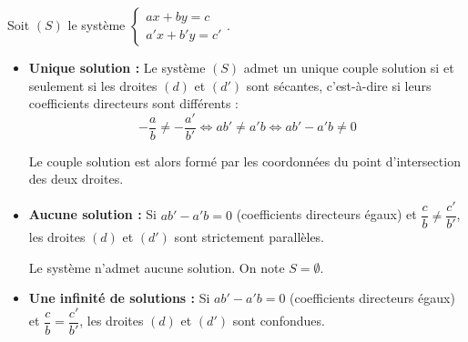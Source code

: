 \begin{propriete}
	Soit $(S)$ le système $\begin{cases} ax + by = c \\ a'x + b'y = c' \end{cases}$.
	\begin{itemize}
		\item \textbf{Unique solution :} Le système $(S)$ admet un unique couple solution si et seulement si les droites $(d)$ et $(d')$ sont sécantes, c'est-à-dire si leurs coefficients directeurs sont différents :
		      \[
			      -\frac{a}{b} \neq -\frac{a'}{b'} \iff ab' \neq a'b \iff ab' - a'b \neq 0
		      \]

		      Le couple solution est alors formé par les coordonnées du point d'intersection des deux droites.
		\item \textbf{Aucune solution :} Si $ab' - a'b = 0$ (coefficients directeurs égaux) et $\dfrac{c}{b}\neq\dfrac{c'}{b'}$, les droites $(d)$ et $(d')$ sont strictement parallèles.

		      Le système n'admet aucune solution. On note $S = \emptyset$.
		\item \textbf{Une infinité de solutions :} Si $ab' - a'b = 0$ (coefficients directeurs égaux) et $\dfrac{c}{b}=\dfrac{c'}{b'}$, les droites $(d)$ et $(d')$ sont confondues.


\end{itemize}
\end{propriete}
